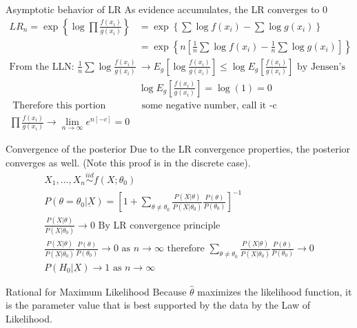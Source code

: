 \documentclass[avery5388,grid,frame]{flashcards}
\begin{document}
 \begin{flashcard}[Proof]{Asymptotic behavior of LR}
\bigskip
As evidence accumulates, the LR converges to 0
{\begin{align*}
LR_n=\exp\left\{\log\prod\frac{f(x_i)}{g(x_i)}\right\}&=\exp\left\{\sum\log f(x_i)-\sum \log g(x_i)\right\}\\
&=\exp\left\{n\left[\frac{1}{n}\sum \log f(x_i)-\frac{1}{n}\sum\log g(x_i)\right]\right\}\\
\textrm{From the LLN: }\frac{1}{n}\sum\log\frac{f(x_i)}{g(x_i)}&\rightarrow E_g\left[\log\frac{f(x_i)}{g(x_i)}\right]\leq \log E_g\left[\frac{f(x_i)}{g(x_i)}\right] \textrm{ by Jensen's }\\
& \log E_g\left[\frac{f(x_i)}{g(x_i)}\right] =\log(1)=0\\ 
\textrm{ Therefore this portion}&\textrm{ some negative number, call it -c}\\
\prod\frac{f(x_i)}{g(x_i)}\rightarrow \lim_{n\rightarrow\infty}e^{n[-c]}=0
\end{align*}}
\end{flashcard}
 \begin{flashcard}[Proof]{Convergence of the posterior}
Due to the LR convergence properties, the posterior converges as well. (Note this proof is in the discrete case).
{\begin{align*}
X_1,...,X_n\overset{iid}{\sim}f(X;\theta_0)\\
P(\theta=\theta_0|\underbar{X})=\left[1+\sum_{\theta\neq\theta_0}\frac{P(\underbar{X}|\theta)}{P(\underbar{X}|\theta_0)}\frac{P(\theta)}{P(\theta_0)}\right]^{-1}\\
\frac{P(\underbar{X}|\theta)}{P(\underbar{X}|\theta_0)}\rightarrow 0\textrm{ By LR convergence principle}\\
\frac{P(\underbar{X}|\theta)}{P(\underbar{X}|\theta_0)}\frac{P(\theta)}{P(\theta_0)}\rightarrow 0 \textrm{ as } n\rightarrow \infty\textrm{ therefore }\sum_{\theta\neq\theta_0}\frac{P(\underbar{X}|\theta)}{P(\underbar{X}|\theta_0)}\frac{P(\theta)}{P(\theta_0)}\rightarrow 0\\
P(H_0|\underbar{X})\rightarrow 1\textrm{ as } n\rightarrow\infty
\end{align*}}
\end{flashcard}
 \begin{flashcard}[Definition]{Rational for Maximum Likelihood}
 \bigskip\bigskip\bigskip\bigskip
Because $\hat{\theta}$ maximizes the likelihood function, it is the parameter value that is best supported by the data by the Law of Likelihood.
\end{flashcard}
\end{document}

